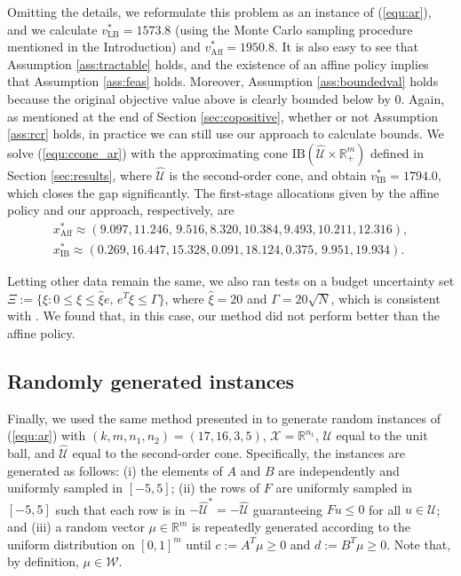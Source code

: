 \documentclass[12pt]{article}
\DeclareMathOperator{\AP}{Aff}
\newcommand{\U}{{\mathcal{U}}}
\newcommand{\W}{{\mathcal{W}}}
\newcommand{\K}{\widehat{\mathcal{U}}}
\newcommand{\X}{{\mathcal{X}}}
\newcommand{\IB}{\mathrm{IB}}
\def\RR{{\mathbb{R}}}
\newcommand{\Q}{{\K \times \RR^m_+}}
\begin{document}
\begin{onehalfspace}
Omitting the details, we reformulate this problem as an instance of
(\ref{equ:ar}), and we calculate $v^*_{\text{LB}} = 1573.8$ (using
the Monte Carlo sampling procedure mentioned in the Introduction)
and $v_{\AP}^*=1950.8$. It is also easy to see that Assumption
\ref{ass:tractable} holds, and the existence of an affine policy
implies that Assumption \ref{ass:feas} holds. Moreover, Assumption
\ref{ass:boundedval} holds because the original objective value above is
clearly bounded below by 0. Again, as mentioned at the end of Section
\ref{sec:copositive}, whether or not Assumption \ref{ass:rcr} holds,
in practice we can still use our approach to calculate bounds. We solve
(\ref{equ:ccone_ar}) with the approximating cone $\IB(\Q)$ defined in
Section \ref{sec:results}, where $\K$ is the second-order cone, and
obtain $v_{\IB}^* = 1794.0$, which closes the gap significantly. The
first-stage allocations given by the affine policy and our approach,
respectively, are
\[
\begin{array}{c}
x_{\AP}^* \approx (9.097, 11.246, \, 9.516, 8.320, 10.384, 9.493, 10.211, 12.316), \\
x_{\IB}^* \approx (0.269, 16.447, 15.328, 0.091, 18.124, 0.375,  \,9.951, 19.934).
\end{array}
\]

Letting other data remain the same, we also ran tests on a budget
uncertainty set $\Xi := \{\xi : 0 \le \xi \le \hat \xi e, \, e^T\xi \le
\Gamma \}$, where $\hat \xi = 20$ and $\Gamma = 20\sqrt{N}$, which is
consistent with \cite{Bertsimas.Ruiter.2016}. We found that, in this
case, our method did not perform better than the affine policy.

\subsection{Randomly generated instances} \label{ssec:random_example}

Finally, we used the same method presented in
\cite{Hadjiyiannis.Goulart.Kuhn.2011} to generate random instances of
(\ref{equ:ar}) with $(k,m,n_1,n_2) = (17, 16, 3, 5)$, $\X = \RR^{n_1}$,
$\U$ equal to the unit ball, and $\K$ equal to the second-order cone.
Specifically, the instances are generated as follows: (i) the elements
of $A$ and $B$ are independently and uniformly sampled in $[-5,5]$; (ii)
the rows of $F$ are uniformly sampled in $[-5, 5]$ such that each row is
in $-\K^* = -\K$ guaranteeing $Fu \le 0$ for all $u \in \U$; and (iii) a
random vector $\mu \in \RR^m$ is repeatedly generated according to the
uniform distribution on $[0,1]^m$ until $c := A^T\mu \ge 0$ and $d :=
B^T\mu \ge 0$. Note that, by definition, $\mu \in \W$.


\end{onehalfspace}
\end{document}
